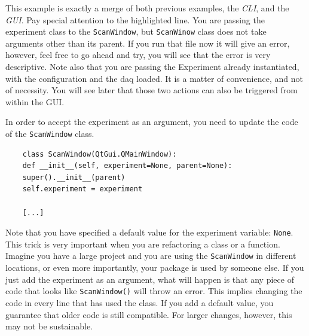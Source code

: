 This example is exactly a merge of both previous examples, the
\emph{CLI}, and the \emph{GUI}. Pay special attention to the
highlighted line. You are passing the experiment class to the
\texttt{ScanWindow}, but \texttt{ScanWinow} class does not take
arguments other than its parent. If you run that file now it will give
an error, however, feel free to go ahead and try, you will see that the
error is very descriptive. Note also that you are passing the Experiment
already instantiated, with the configuration and the daq loaded. It is a
matter of convenience, and not of necessity. You will see later that
those two actions can also be triggered from within the {GUI}.

In order to accept the experiment as an argument, you need to update the
code of the \texttt{ScanWindow} class.

\begin{verbatim}
    class ScanWindow(QtGui.QMainWindow):
    def __init__(self, experiment=None, parent=None):
    super().__init__(parent)
    self.experiment = experiment

    [...]
\end{verbatim}

Note that you have specified a default value for the experiment
variable: \texttt{None}. This trick is very important when you are
refactoring a class or a function. Imagine you have a large project and
you are using the \texttt{ScanWindow} in different locations, or even
more importantly, your package is used by someone else. If you just add
the experiment as an argument, what will happen is that any piece of
code that looks like \texttt{ScanWindow()} will throw an error. This
implies changing the code in every line that has used the class. If you
add a default value, you guarantee that older code is still compatible.
For larger changes, however, this may not be sustainable.





